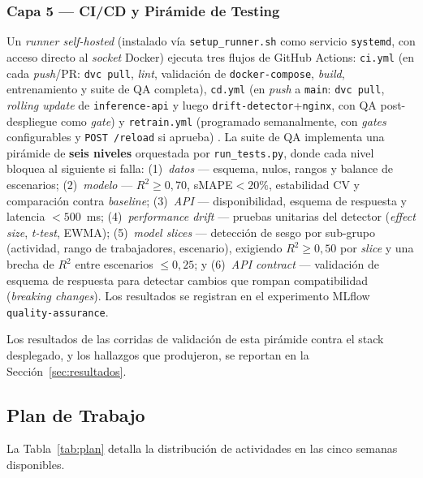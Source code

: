 \documentclass[conference]{IEEEtran}
\begin{document}
\subsubsection{Capa 5 — CI/CD y Pirámide de Testing}
Un \textit{runner self-hosted} (instalado vía \texttt{setup\_runner.sh} como servicio \texttt{systemd}, con acceso directo al \textit{socket} Docker) ejecuta tres flujos de GitHub Actions: \texttt{ci.yml} (en cada \textit{push}/PR: \texttt{dvc pull}, \textit{lint}, validación de \texttt{docker-compose}, \textit{build}, entrenamiento y suite de QA completa), \texttt{cd.yml} (en \textit{push} a \texttt{main}: \texttt{dvc pull}, \textit{rolling update} de \texttt{inference-api} y luego \texttt{drift-detector}+\texttt{nginx}, con QA post-despliegue como \textit{gate}) y \texttt{retrain.yml} (programado semanalmente, con \textit{gates} configurables y \texttt{POST~/reload} si aprueba) \cite{ozimek2026}. La suite de QA implementa una pirámide de \textbf{seis niveles} orquestada por \texttt{run\_tests.py}, donde cada nivel bloquea al siguiente si falla: (1)~\textit{datos} — esquema, nulos, rangos y balance de escenarios; (2)~\textit{modelo} — $R^2\geq0{,}70$, sMAPE$<20\%$, estabilidad CV y comparación contra \textit{baseline}; (3)~\textit{API} — disponibilidad, esquema de respuesta y latencia $<500$~ms; (4)~\textit{performance drift} — pruebas unitarias del detector (\textit{effect size}, \textit{t-test}, EWMA); (5)~\textit{model slices} — detección de sesgo por sub-grupo (actividad, rango de trabajadores, escenario), exigiendo $R^2\geq0{,}50$ por \textit{slice} y una brecha de $R^2$ entre escenarios $\leq0{,}25$; y (6)~\textit{API contract} — validación de esquema de respuesta para detectar cambios que rompan compatibilidad (\textit{breaking changes}). Los resultados se registran en el experimento MLflow \texttt{quality-assurance}.

Los resultados de las corridas de validación de esta pirámide contra el stack desplegado, y los hallazgos que produjeron, se reportan en la Sección~\ref{sec:resultados}.

\subsection{Plan de Trabajo}

La Tabla~\ref{tab:plan} detalla la distribución de actividades en las cinco semanas disponibles.
\end{document}
